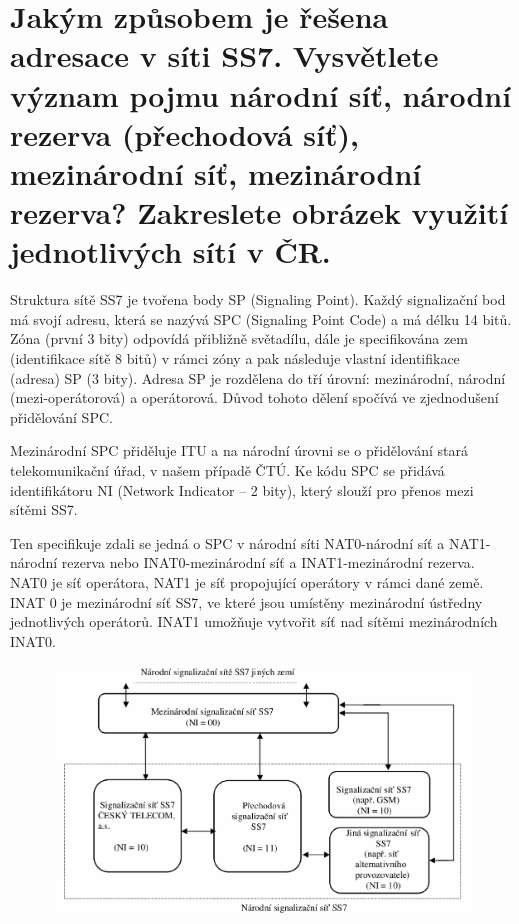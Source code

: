 \section{Jakým způsobem je řešena adresace v síti SS7. Vysvětlete význam pojmu národní síť, národní rezerva (přechodová síť), mezinárodní síť, mezinárodní rezerva? Zakreslete obrázek využití jednotlivých sítí v ČR.}

Struktura sítě SS7 je tvořena body SP (Signaling Point). Každý signalizační bod má svojí adresu, která se nazývá SPC (Signaling Point Code) a má délku 14 bitů. Zóna (první 3 bity) odpovídá přibližně světadílu, dále je specifikována zem (identifikace sítě 8 bitů) v rámci zóny a pak následuje vlastní identifikace (adresa) SP (3 bity). Adresa SP je rozdělena do tří úrovní: mezinárodní, národní (mezi-operátorová) a operátorová. Důvod tohoto dělení spočívá ve zjednodušení přidělování SPC.

Mezinárodní SPC přiděluje ITU a na národní úrovni se o přidělování stará telekomunikační úřad, v našem případě ČTÚ. Ke kódu SPC se přidává identifikátoru NI (Network Indicator -- 2 bity), který slouží pro přenos mezi sítěmi SS7.

Ten specifikuje zdali se jedná o SPC v národní síti NAT0-národní síť a NAT1-národní rezerva nebo INAT0-mezinárodní síť a INAT1-mezinárodní rezerva. NAT0 je síť operátora, NAT1 je síť propojující operátory v rámci dané země. INAT 0 je mezinárodní síť SS7, ve které jsou umístěny mezinárodní ústředny jednotlivých operátorů. INAT1 umožňuje vytvořit síť nad sítěmi mezinárodních INAT0.

\begin{figure}[h!]
    \begin{center}
        \includegraphics[width=\textwidth]{images/otazka19.png}
        \label{img:9}
    \end{center}
\end{figure}

